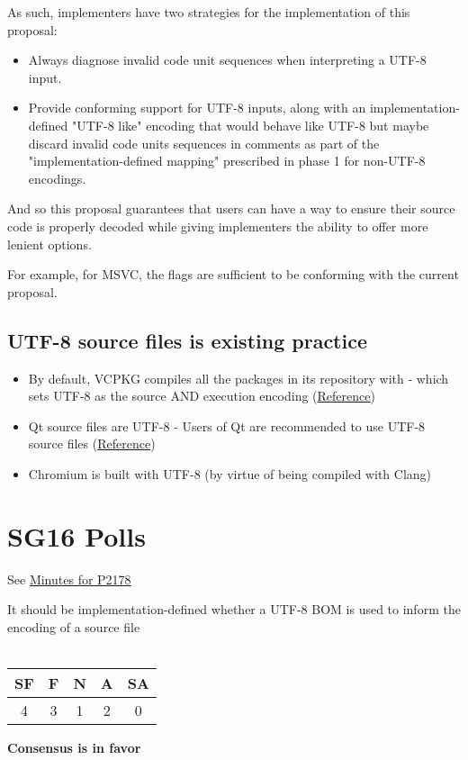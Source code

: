 \documentclass{wg21}
\begin{document}
As such, implementers have two strategies for the implementation of this proposal:

\begin{itemize}
\item Always diagnose invalid code unit sequences when interpreting a UTF-8 input.
\item Provide conforming support for UTF-8 inputs, along with an implementation-defined "UTF-8 like" encoding that would behave like UTF-8 but maybe discard
invalid code units sequences in comments as part of the "implementation-defined mapping" prescribed in phase 1 for non-UTF-8 encodings.
\end{itemize}

And so this proposal guarantees that users can have a way to ensure their source code is properly decoded while giving implementers
the ability to offer more lenient options.

For example, for MSVC, the flags  are sufficient to be conforming with the current proposal.


\subsection{UTF-8 source files is existing practice}

\begin{itemize}
    \item By default, VCPKG compiles all the packages in its repository with  - which sets UTF-8 as the source AND execution encoding (\href{https://github.com/vicroms/vcpkg/blob/master/scripts/toolchains/windows.cmake#L16}{Reference})
    \item Qt source files are UTF-8 - Users of Qt are recommended to use UTF-8 source files (\href{https://wiki.qt.io/Strings_and_encodings_in_Qt}{Reference})
    \item Chromium is built with UTF-8 (by virtue of being compiled with Clang)
\end{itemize}
\pagebreak
\section{SG16 Polls}

See \href{https://github.com/sg16-unicode/sg16-meetings/blob/master/README-2020.md}{Minutes for P2178}

\begin{quoteblock}
It should be implementation-defined whether a UTF-8 BOM is used to inform the encoding of a source file
\\\\
\begin{tabular}{|c|c|c|c|c|}
\hline
SF & F & N & A & SA \\
\hline
4 & 3 & 1 & 2 & 0 \\
\hline
\end{tabular}

\textbf{Consensus is in favor}
\end{quoteblock}
\end{document}

